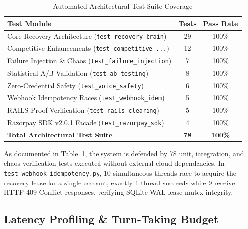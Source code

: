 \documentclass[10pt, twocolumn, a4paper]{article}
\begin{document}
\begin{table}[t]
\centering
\small
\caption{Automated Architectural Test Suite Coverage}
\label{tab:tests}
\begin{tabularx}{\linewidth}{Xcc}
\toprule
\textbf{Test Module} & \textbf{Tests} & \textbf{Pass Rate} \\
\midrule
Core Recovery Architecture (\texttt{test\_recovery\_brain}) & 29 & 100\% \\
Competitive Enhancements (\texttt{test\_competitive\_...}) & 12 & 100\% \\
Failure Injection \& Chaos (\texttt{test\_failure\_injection}) & 7 & 100\% \\
Statistical A/B Validation (\texttt{test\_ab\_testing}) & 8 & 100\% \\
Zero-Credential Safety (\texttt{test\_voice\_safety}) & 6 & 100\% \\
Webhook Idempotency Races (\texttt{test\_webhook\_idem}) & 5 & 100\% \\
RAILS Proof Verification (\texttt{test\_rails\_clearing}) & 5 & 100\% \\
Razorpay SDK v2.0.1 Facade (\texttt{test\_razorpay\_sdk}) & 4 & 100\% \\
\midrule
\textbf{Total Architectural Test Suite} & \textbf{78} & \textbf{100\%} \\
\bottomrule
\end{tabularx}
\end{table}

As documented in Table~\ref{tab:tests}, the system is defended by 78 unit, integration, and chaos verification tests executed without external cloud dependencies. In \texttt{test\_webhook\_idempotency.py}, 10 simultaneous threads race to acquire the recovery lease for a single account; exactly 1 thread succeeds while 9 receive HTTP 409 Conflict responses, verifying SQLite WAL lease mutex integrity.

\subsection{Latency Profiling \& Turn-Taking Budget}
\end{document}
